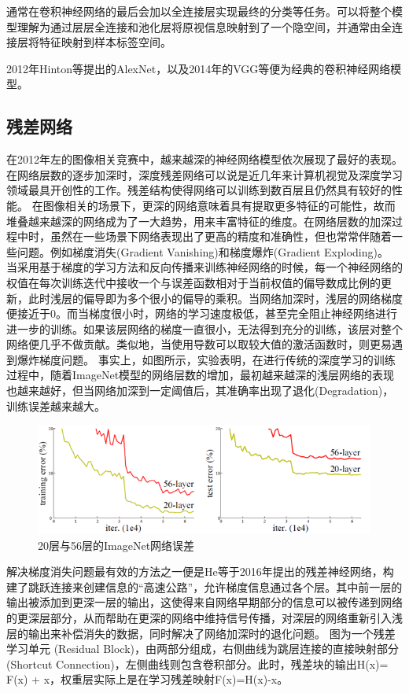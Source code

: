 通常在卷积神经网络的最后会加以全连接层实现最终的分类等任务。可以将整个模型理解为通过层层全连接和池化层将原视信息映射到了一个隐空间，并通常由全连接层将特征映射到样本标签空间。

2012年Hinton等提出的AlexNet，以及2014年的VGG等便为经典的卷积神经网络模型。



\subsection{残差网络}{}

在2012年左的图像相关竞赛中，越来越深的神经网络模型依次展现了最好的表现。在网络层数的逐步加深时，深度残差网络可以说是近几年来计算机视觉及深度学习领域最具开创性的工作。残差结构使得网络可以训练到数百层且仍然具有较好的性能。
在图像相关的场景下，更深的网络意味着具有提取更多特征的可能性，故而堆叠越来越深的网络成为了一大趋势，用来丰富特征的维度。在网络层数的加深过程中时，虽然在一些场景下网络表现出了更高的精度和准确性，但也常常伴随着一些问题。例如梯度消失(Gradient Vanishing)和梯度爆炸(Gradient Exploding)。
当采用基于梯度的学习方法和反向传播来训练神经网络的时候，每一个神经网络的权值在每次训练迭代中接收一个与误差函数相对于当前权值的偏导数成比例的更新，此时浅层的偏导即为多个很小的偏导的乘积。当网络加深时，浅层的网络梯度便接近于0。而当梯度很小时，网络的学习速度极低，甚至完全阻止神经网络进行进一步的训练。如果该层网络的梯度一直很小，无法得到充分的训练，该层对整个网络便几乎不做贡献。类似地，当使用导数可以取较大值的激活函数时，则更易遇到爆炸梯度问题。
事实上，如图所示，实验表明，在进行传统的深度学习的训练过程中，随着ImageNet模型的网络层数的增加，最初越来越深的浅层网络的表现也越来越好，但当网络加深到一定阈值后，其准确率出现了退化(Degradation)，训练误差越来越大。

\begin{figure}[h]
	\centering
	\includegraphics[scale=0.4]{figures/9.png}
	\caption{20层与56层的ImageNet网络误差}
	\label{fig:f9}
\end{figure}

解决梯度消失问题最有效的方法之一便是He等于2016年提出的残差神经网络，构建了跳跃连接来创建信息的“高速公路”，允许梯度信息通过各个层。其中前一层的输出被添加到更深一层的输出，这使得来自网络早期部分的信息可以被传递到网络的更深层部分，从而帮助在更深的网络中维持信号传播，对深层的网络重新引入浅层的输出来补偿消失的数据，同时解决了网络加深时的退化问题。
图为一个残差学习单元 (Residual Block)，由两部分组成，右侧曲线为跳层连接的直接映射部分(Shortcut Connection)，左侧曲线则包含卷积部分。此时，残差块的输出H(x)= F(x) + x，权重层实际上是在学习残差映射F(x)=H(x)-x。

